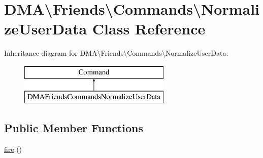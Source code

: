 \hypertarget{classDMA_1_1Friends_1_1Commands_1_1NormalizeUserData}{\section{D\+M\+A\textbackslash{}Friends\textbackslash{}Commands\textbackslash{}Normalize\+User\+Data Class Reference}
\label{classDMA_1_1Friends_1_1Commands_1_1NormalizeUserData}
}
Inheritance diagram for D\+M\+A\textbackslash{}Friends\textbackslash{}Commands\textbackslash{}Normalize\+User\+Data\+:\begin{figure}[H]
\begin{center}
\leavevmode
\includegraphics[height=2.000000cm]{dc/d26/classDMA_1_1Friends_1_1Commands_1_1NormalizeUserData}
\end{center}
\end{figure}
\subsection*{Public Member Functions}
\begin{DoxyCompactItemize}
\item 
\hyperlink{classDMA_1_1Friends_1_1Commands_1_1NormalizeUserData_abb6a366bfe6d71d57c38eac99befc8f6}{fire} ()
\end{DoxyCompactItemize}
